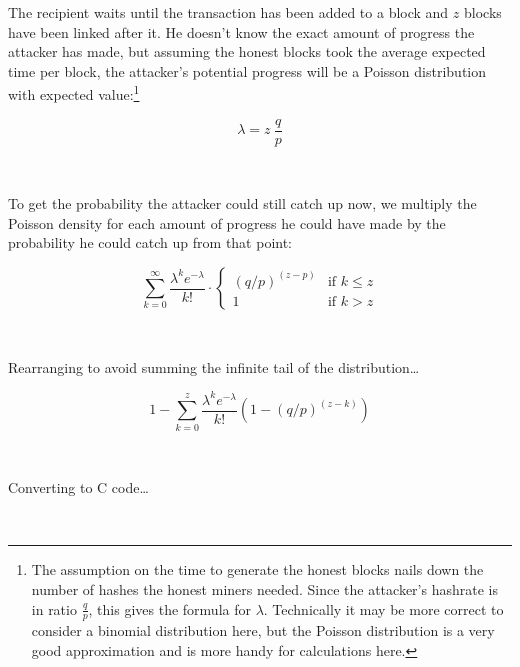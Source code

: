 \documentclass[nohyper]{tufte-handout}
\begin{document}
The recipient waits until the transaction has been added to a block and
$z$ blocks have been linked after it. He doesn't know the exact amount of
progress the attacker has made, but assuming the honest blocks took the
average expected time per block, the attacker's potential progress will
be a Poisson distribution with expected value:\footnote{The assumption on the time to generate the honest blocks nails down the number of hashes the honest miners needed.  Since the attacker's hashrate is in ratio $\frac{q}{p}$, this gives the formula for $\lambda$.  Technically it may be more correct to consider a binomial distribution here, but the Poisson distribution is a very good approximation and is more handy for calculations here.}

\begin{equation}
\lambda = z \ \frac{q}{p}
\end{equation}

\

To get the probability the attacker could still catch up now, we
multiply the Poisson density for each amount of progress he could have
made by the probability he could catch up from that point:

\begin{equation}
\sum _{k=0}^\infty \frac{\lambda ^k e^{-\lambda}}{k!} \cdot 
\begin{cases}
    \left(q/p\right)^{(z-p)} & \text{if } k \leqslant z \\
    1                     & \text{if } k > z
\end{cases}
\end{equation}

\

Rearranging to avoid summing the infinite tail of the
distribution\ldots{}

 
\begin{equation}
1 - \sum _{k=0}^z \frac{\lambda ^k e^{-\lambda}}{k!} \left(1 - \left(q/p\right)^{(z-k)}\right)
\end{equation}

\

Converting to C code\ldots{}

\

\end{document}
